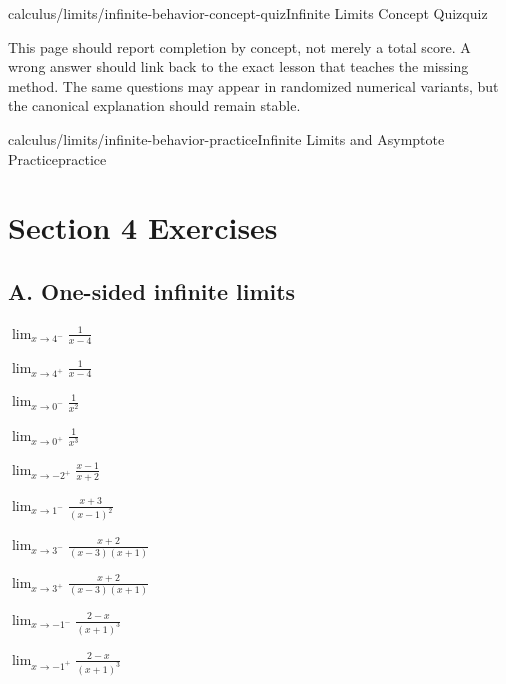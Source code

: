 \begin{webpage}{calculus/limits/infinite-behavior-concept-quiz}{Infinite Limits Concept Quiz}{quiz}
\begin{bgsummary}[title={Quiz use on the website}]
This page should report completion by concept, not merely a total score. A wrong answer should link back to the exact lesson that teaches the missing method. The same questions may appear in randomized numerical variants, but the canonical explanation should remain stable.
\end{bgsummary}
\end{webpage}

\begin{webpage}{calculus/limits/infinite-behavior-practice}{Infinite Limits and Asymptote Practice}{practice}
\section*{Section 4 Exercises}

\subsection*{A. One-sided infinite limits}
\begin{bgexercises}[label=\textbf{4.\arabic*}]
  \item \(\displaystyle\lim_{x\to4^-}\frac1{x-4}\)
  \item \(\displaystyle\lim_{x\to4^+}\frac1{x-4}\)
  \item \(\displaystyle\lim_{x\to0^-}\frac1{x^2}\)
  \item \(\displaystyle\lim_{x\to0^+}\frac1{x^3}\)
  \item \(\displaystyle\lim_{x\to-2^+}\frac{x-1}{x+2}\)
  \item \(\displaystyle\lim_{x\to1^-}\frac{x+3}{(x-1)^2}\)
  \item \(\displaystyle\lim_{x\to3^-}\frac{x+2}{(x-3)(x+1)}\)
  \item \(\displaystyle\lim_{x\to3^+}\frac{x+2}{(x-3)(x+1)}\)
  \item \(\displaystyle\lim_{x\to-1^-}\frac{2-x}{(x+1)^3}\)
  \item \(\displaystyle\lim_{x\to-1^+}\frac{2-x}{(x+1)^3}\)
\end{bgexercises}


\end{webpage}
